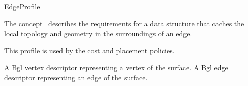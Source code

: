 
\begin{ccRefConcept}{EdgeProfile}


\ccDefinition

The concept \ccRefName\ describes the requirements for a data structure that caches the local topology and geometry in the surroundings of an edge.

This profile is used by the cost and placement policies.

\ccTypes
\ccGlue    
  {A {\sc Bgl} vertex descriptor representing a vertex of the surface.}
\ccGlue    
  {A {\sc Bgl} edge descriptor representing an edge of the surface.}
\ccGlue    

\ccCreation
{}  %


\end{ccRefConcept}
